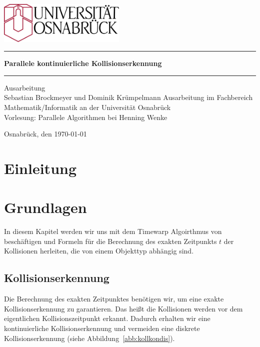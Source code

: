 \documentclass[a4paper, 10pt, openright, parskip, chapterprefix]{scrreprt}
\begin{document}
\begin{titlepage}
\thispagestyle{empty}
\vspace{10mm}
\begin{center}
\includegraphics[height=20mm]{unilogo.eps}
\vfill
\rule{\textwidth}{0.1mm}\vspace{5mm}
\Huge\textbf{Parallele kontinuierliche Kollisionserkennung}
\vspace{1mm}\rule{\textwidth}{0.1mm}
\vfill
\Large
Ausarbeitung\\
Sebastian Brockmeyer und Dominik Krümpelmann
\vfill
\normalsize
Ausarbeitung  im Fachbereich Mathematik/Informatik an der Universität Osnabrück \\
Vorlesung: Parallele Algorithmen bei Henning Wenke

Osnabrück, den \today
\end{center}
\end{titlepage}

\newpage
\mbox{}
\thispagestyle{empty}
\chapter*{Einleitung}
\setcounter{page}{1}

\newpage
\mbox{}
\thispagestyle{empty}
\newpage
\clearpage
\setcounter{page}{2}
\tableofcontents
\listoffigures
\newpage



\chapter{Grundlagen}
In diesem Kapitel werden wir uns mit dem Timewarp Algoirthmus von~\cite{timewarp} beschäftigen und
Formeln für die Berechnung des exakten Zeitpunkts $t$ der Kollisionen herleiten, die von einem 
Objekttyp abhängig sind.

\section{Kollisionserkennung}
Die Berechnung des exakten Zeitpunktes benötigen wir, um eine exakte Kollisionserkennung zu garantieren. Das heißt die Kollisionen werden vor dem eigentlichen Kollisionszeitpunkt erkannt. Dadurch erhalten wir eine kontinuierliche Kollisionserkennung und vermeiden eine diskrete Kollisionserkennung (siehe Abbildung~\ref{abb:kollkondis}).
\end{document}
